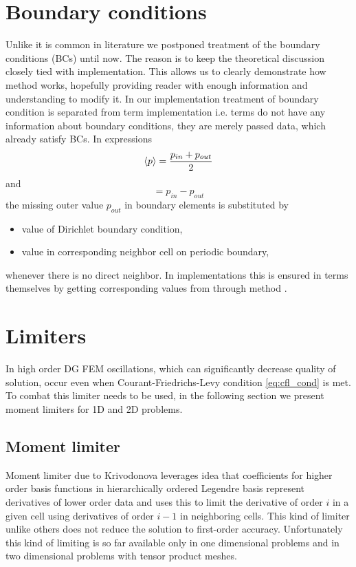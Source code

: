 \section{Boundary conditions}
Unlike it is common in literature we postponed treatment of the boundary 
conditions (BCs) until now. The reason is to keep the theoretical discussion 
closely tied with implementation. This allows us to clearly demonstrate how 
method works, hopefully providing reader with enough information and 
understanding to modify it. In our implementation treatment of boundary 
condition is separated from term implementation i.e. terms do not have any 
information about boundary conditions, they are merely passed data, which 
already satisfy BCs.
In expressions
\begin{equation}
      \langle p\rangle = \frac{p_{in} + p_{out}}{2}
\end{equation}
and 
\begin{equation}
    [p] = p_{in} - p_{out}
\end{equation}
the missing outer value $p_{out}$ in boundary elements is substituted by
\begin{itemize}
    \item value of Dirichlet boundary condition, 
    \item value in corresponding neighbor cell on periodic boundary,
\end{itemize} 
whenever there is no direct neighbor.
In implementations this is ensured in terms themselves by getting corresponding values 
from  through method .

\newpage
\section{Limiters}
\label{se:limiters}
In high order DG FEM oscillations, which can significantly decrease quality of 
solution, occur even when Courant-Friedrichs-Levy condition \eqref{eq:cfl_cond} is met. 
To combat this limiter needs to be used, in the following section we present moment 
limiters for 1D and 
2D problems.

\subsection{Moment limiter}
Moment limiter due to Krivodonova \cite{Krivodonova2007} leverages idea that 
coefficients for higher order basis functions in hierarchically ordered 
Legendre basis represent derivatives of lower order data and uses this to 
limit the derivative of order $i$ in a given cell using derivatives of order 
$i - 1$ in neighboring cells. This kind of limiter unlike others does not 
reduce the solution to first-order accuracy. Unfortunately this kind of 
limiting is so far available only in one dimensional problems and in two 
dimensional problems with tensor product meshes.

